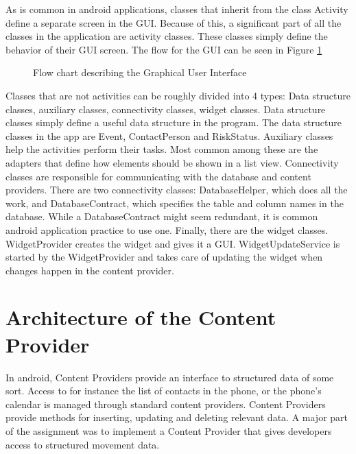 As is common in android applications, classes that inherit from the class Activity define a separate screen in the GUI. Because of this, a significant part of all the classes in the application are activity classes. These classes simply define the behavior of their GUI screen. The flow for the GUI can be seen in Figure \ref{fig:FlowchartGUI}
\begin{figure}
\setlength\fboxsep{0pt}
\setlength\fboxrule{1pt}\noindent{}
\caption{Flow chart describing the Graphical User Interface}
\label{fig:FlowchartGUI}
\end{figure}

Classes that are not activities can be roughly divided into 4 types: Data structure classes, auxiliary classes, connectivity classes, widget classes. Data structure classes simply define a useful data structure in the program. The data structure classes in the app are Event, ContactPerson and RiskStatus. Auxiliary classes help the activities perform their tasks. Most common among these are the adapters that define how elements should be shown in a list view. Connectivity classes are responsible for communicating with the database and content providers. There are two connectivity classes: DatabaseHelper, which does all the work, and DatabaseContract, which specifies the table and column names in the database. While a DatabaseContract might seem redundant, it is common android application practice to use one. Finally, there are the widget classes. WidgetProvider creates the widget and gives it a GUI. WidgetUpdateService is started by the WidgetProvider and takes care of updating the widget when changes happen in the content provider.

\section{Architecture of the Content Provider}
In android, Content Providers provide an interface to structured data of some sort. Access to for instance the list of contacts in the phone, or the phone's calendar is managed through standard content providers. Content Providers provide methods for inserting, updating and deleting relevant data. A major part of the assignment was to implement a Content Provider that gives developers access to structured movement data.


